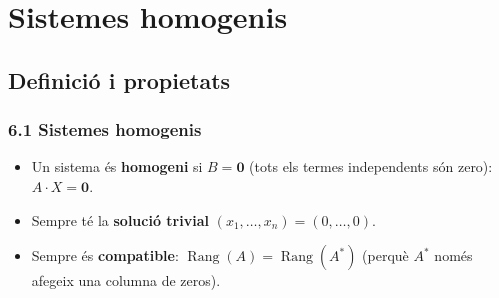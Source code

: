 \documentclass[aspectratio=169]{beamer}
\begin{document}
\section{Sistemes homogenis}
\subsection{Definició i propietats}

\begin{frame}[t]
  \frametitle{6.1 Sistemes homogenis}

  \vspace{-0.2cm}
  \begin{itemize}
    \item<1-> Un sistema és \textbf{homogeni} si $B=\mathbf{0}$
      (tots els termes independents són zero): $A\cdot X=\mathbf{0}$.
    \item<2-> Sempre té la \textbf{solució trivial}
      $(x_1,\ldots,x_n)=(0,\ldots,0)$.
    \item<3-> Sempre és \textbf{compatible}:
      $\operatorname{Rang}(A)=\operatorname{Rang}(A^*)$
      (perquè $A^*$ només afegeix una columna de zeros).
  \end{itemize}

  \vspace{0.1cm}
\end{frame}
\end{document}

